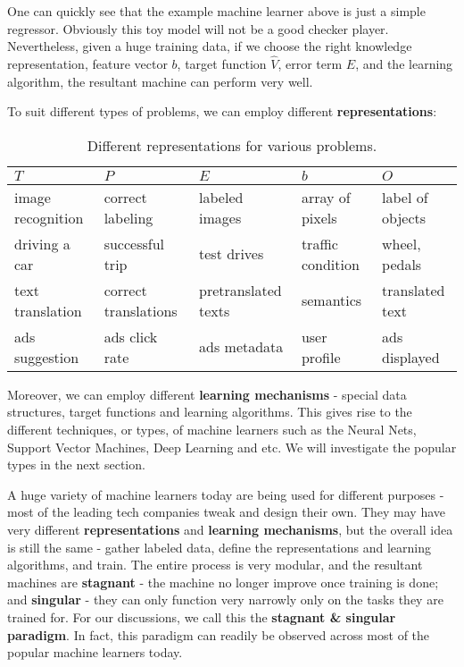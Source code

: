 \documentclass[12pt]{article}  %
\begin{document}
One can quickly see that the example machine learner above is just a simple regressor. Obviously this toy model will not be a good checker player. Nevertheless, given a huge training data, if we choose the right knowledge representation, feature vector $b$, target function $\hat{V}$, error term $E$, and the learning algorithm, the resultant machine can perform very well. 

To suit different types of problems, we can employ different {\bf representations}:



\begin{table}[h]
\begin{center}
\begin{tabular}{ | l | l | l || l | l |}

\hline
$T$ & $P$ & $E$ & $b$ & $O$ \\
\hline \hline
image recognition & correct labeling & labeled images & array of pixels & label of objects \\
\hline
driving a car & successful trip & test drives & traffic condition & wheel, pedals  \\
\hline
text translation & correct translations & pretranslated texts & semantics & translated text \\
\hline
ads suggestion & ads click rate & ads metadata & user profile & ads displayed \\
\hline
\end{tabular}
\caption{Different representations for various problems.}

\end{center}
\end{table}



Moreover, we can employ different {\bf learning mechanisms} - special data structures, target functions and learning algorithms. This gives rise to the different techniques, or types, of machine learners such as the Neural Nets, Support Vector Machines, Deep Learning and etc. We will investigate the popular types in the next section.

A huge variety of machine learners today are being used for different purposes - most of the leading tech companies tweak and design their own. They may have very different {\bf representations} and {\bf learning mechanisms}, but the overall idea is still the same - gather labeled data, define the representations and learning algorithms, and train. The entire process is very modular, and the resultant machines are {\bf stagnant} - the machine no longer improve once training is done; and {\bf singular} - they can only function very narrowly only on the tasks they are trained for. For our discussions, we call this the {\bf stagnant \& singular paradigm}. In fact, this paradigm can readily be observed across most of the popular machine learners today.
\end{document}
